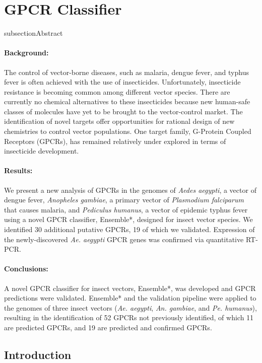 \section{GPCR Classifier}

subsection{Abstract}

\paragraph*{Background:}
The control of vector-borne diseases, such as malaria, dengue fever, and typhus fever is often achieved with the use of insecticides. Unfortunately, insecticide resistance is becoming common among different vector species. There are currently no chemical alternatives to these insecticides because new human-safe classes of molecules have yet to be brought to the vector-control market.  The identification of novel targets offer opportunities for rational design of new chemistries to control vector populations. One target family, G-Protein Coupled Receptors (GPCRs), has remained relatively under explored in terms of insecticide development.

\paragraph*{Results:}
We present a new analysis of GPCRs in the genomes of \emph{Aedes aegypti}, a vector of dengue fever, \emph{Anopheles gambiae}, a primary vector of \emph{Plasmodium falciparum} that causes malaria, and \emph{Pediculus humanus}, a vector of epidemic typhus fever using a novel GPCR classifier, Ensemble*, designed for insect vector species.  We identified 30 additional putative GPCRs, 19 of which we validated.  Expression of the newly-discovered \emph{Ae. aegypti} GPCR genes was confirmed via quantitative RT-PCR.

\paragraph*{Conclusions:}
A novel GPCR classifier for insect vectors, Ensemble*, was developed and GPCR predictions were validated. Ensemble* and the validation pipeline were applied to the genomes of three insect vectors (\emph{Ae. aegypti}, \emph{An. gambiae}, and \emph{Pe. humanus}), resulting in the identification of 52 GPCRs not previously identified, of which 11 are predicted GPCRs, and 19 are predicted and confirmed GPCRs.

\subsection{Introduction}


